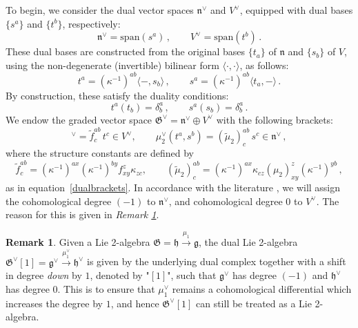 \documentclass[11pt]{amsart}
\newcommand{\fg}{\mathfrak{g}}
\newcommand{\fn}{\mathfrak{n}}
\newcommand{\fh}{\mathfrak{h}}
\newcommand{\fG}{\mathfrak{G}}
\numberwithin{equation}{section}
\numberwithin{figure}{section}
\numberwithin{table}{section}
\theoremstyle{thm}
\numberwithin{equation}{subsection}
\theoremstyle{definition}
\theoremstyle{rem}
\newtheorem{remark}{Remark}
\begin{document}
To begin, we consider the dual vector spaces \( \mathfrak{n}^\vee \) and \( V^\vee \), equipped with dual bases \( \{s^a\} \) and \( \{t^b\} \), respectively:
\begin{equation}
    \mathfrak{n}^\vee = \mathrm{span}(s^a) \,,\qquad V^\vee = \mathrm{span}(t^b)\,.
\end{equation}
These dual bases are constructed from the original bases \( \{t_a\} \) of \( \mathfrak{n} \) and \( \{s_b\} \) of \( V \), using the non-degenerate (invertible) bilinear form \( \langle \cdot, \cdot \rangle \), as follows:
\begin{equation}
    t^a = (\kappa^{-1})^{ab} \langle -, s_b \rangle \,,\qquad
    s^a = (\kappa^{-1})^{ab} \langle t_a, - \rangle\,.
\end{equation}
By construction, these satisfy the duality conditions:
\begin{equation}
    t^a(t_b) = \delta^a_b \,,\qquad s^a(s_b) = \delta^a_b\,.
\end{equation}
We endow the graded vector space \( \mathfrak{G}^\vee = \mathfrak{n}^\vee \oplus V^\vee \) with the following brackets:
\begin{equation}
    [t^a, t^b]^\vee = \tilde f^{ab}_c\, t^c \in V^\vee, \qquad
    \mu_2^\vee(t^a,s^b) = (\tilde\mu_2)^{ab}_c\, s^c \in \mathfrak{n}^\vee\,,
    \label{ec:aff2liealgbrack}
\end{equation}
where the structure constants are defined by
\begin{equation}
        \tilde f^{ab}_c = (\kappa^{-1})^{ax}(\kappa^{-1})^{by}f_{xy}^z\kappa_{zc},\qquad  (\tilde\mu_2)^{ab}_c = (\kappa^{-1})^{ax}\kappa_{cz}(\mu_2)_{xy}^z(\kappa^{-1})^{yb} \,,\label{ec:dualbrackets2}
    \end{equation}
as in equation~\eqref{dualbrackets}. In accordance with the literature  \cite{Chen:2012gz,Chen:2013,Bai_2013,chen:2022}, we will assign the cohomological degree $(-1)$ to $\fn^\vee$, and cohomological degree $0$ to $V^\vee$. The reason for this is given in \textit{Remark \ref{dualdegree}}.

\begin{remark}\label{dualdegree}
    Given a Lie 2-algebra $\fG = \fh\xrightarrow{\mu_1}\fg$, the dual Lie 2-algebra $\fG^\vee[1] = \fg^\vee\xrightarrow{\mu_1^\vee}\fh^\vee$ is given by the underlying dual complex together with a shift in degree \textit{down} by $1$, denoted by "$[1]$", such that $\fg^\vee$ has degree $(-1)$ and $\fh^\vee$ has degree $0$. This is to ensure that $\mu_1^\vee$ remains a cohomological differential which increases the degree by $1$, and hence $\fG^\vee[1]$ can still be treated as a Lie 2-algebra.
\end{remark} 
\end{document}
